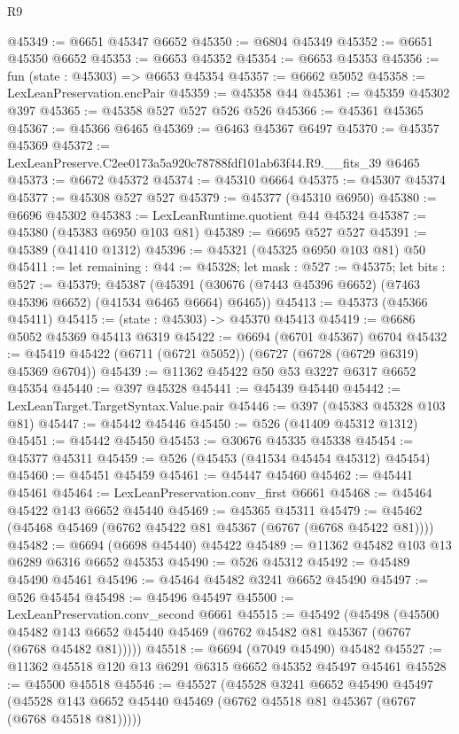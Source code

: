 \begin{lexlean}{R9}
\begin{coremodule}
@45349 := @6651 @45347 @6652
@45350 := @6804 @45349
@45352 := @6651 @45350 @6652
@45353 := @6653 @45352
@45354 := @6653 @45353
@45356 := fun (state : @45303) => @6653 @45354
@45357 := @6662 @5052
@45358 := LexLeanPreservation.encPair
@45359 := @45358 @44
@45361 := @45359 @45302 @397
@45365 := @45358 @527 @527 @526 @526
@45366 := @45361 @45365
@45367 := @45366 @6465
@45369 := @6463 @45367 @6497
@45370 := @45357 @45369
@45372 := LexLeanPreserve.C2ee0173a5a920c78788fdf101ab63f44.R9.__fits_39 @6465
@45373 := @6672 @45372
@45374 := @45310 @6664
@45375 := @45307 @45374
@45377 := @45308 @527 @527
@45379 := @45377 (@45310 @6950)
@45380 := @6696 @45302
@45383 := LexLeanRuntime.quotient @44 @45324
@45387 := @45380 (@45383 @6950 @103 @81)
@45389 := @6695 @527 @527
@45391 := @45389 (@41410 @1312)
@45396 := @45321 (@45325 @6950 @103 @81) @50
@45411 := let remaining : @44 := @45328;
  let mask : @527 := @45375;
  let bits : @527 := @45379;
  @45387 (@45391 (@30676 (@7443 @45396 @6652) (@7463 @45396 @6652) (@41534 @6465 @6664) @6465))
@45413 := @45373 (@45366 @45411)
@45415 := (state : @45303) -> @45370 @45413
@45419 := @6686 @5052 @45369 @45413 @6319
@45422 := @6694 (@6701 @45367) @6704
@45432 := @45419 @45422 (@6711 (@6721 @5052)) (@6727 (@6728 (@6729 @6319) @45369 @6704))
@45439 := @11362 @45422 @50 @53 @3227 @6317 @6652 @45354
@45440 := @397 @45328
@45441 := @45439 @45440
@45442 := LexLeanTarget.TargetSyntax.Value.pair
@45446 := @397 (@45383 @45328 @103 @81)
@45447 := @45442 @45446
@45450 := @526 (@41409 @45312 @1312)
@45451 := @45442 @45450
@45453 := @30676 @45335 @45338
@45454 := @45377 @45311
@45459 := @526 (@45453 (@41534 @45454 @45312) @45454)
@45460 := @45451 @45459
@45461 := @45447 @45460
@45462 := @45441 @45461
@45464 := LexLeanPreservation.conv_first @6661
@45468 := @45464 @45422 @143 @6652 @45440
@45469 := @45365 @45311
@45479 := @45462 (@45468 @45469 (@6762 @45422 @81 @45367 (@6767 (@6768 @45422 @81))))
@45482 := @6694 (@6698 @45440) @45422
@45489 := @11362 @45482 @103 @13 @6289 @6316 @6652 @45353
@45490 := @526 @45312
@45492 := @45489 @45490 @45461
@45496 := @45464 @45482 @3241 @6652 @45490
@45497 := @526 @45454
@45498 := @45496 @45497
@45500 := LexLeanPreservation.conv_second @6661
@45515 := @45492
    (@45498
      (@45500 @45482 @143 @6652 @45440 @45469 (@6762 @45482 @81 @45367 (@6767 (@6768 @45482 @81)))))
@45518 := @6694 (@7049 @45490) @45482
@45527 := @11362 @45518 @120 @13 @6291 @6315 @6652 @45352 @45497 @45461
@45528 := @45500 @45518
@45546 := @45527
    (@45528
      @3241
      @6652
      @45490
      @45497
      (@45528 @143 @6652 @45440 @45469 (@6762 @45518 @81 @45367 (@6767 (@6768 @45518 @81)))))

\end{coremodule}
\end{lexlean}

